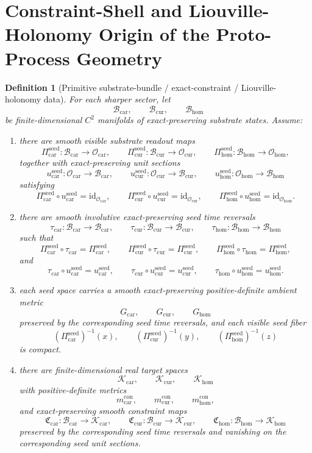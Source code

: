 \documentclass[11pt]{article}
\newcommand{\TensorObjClass}{\mathcal O_{\mathrm{car}}}
\newcommand{\CurObjClass}{\mathcal O_{\mathrm{cur}}}
\newcommand{\HomObjClass}{\mathcal O_{\mathrm{hom}}}
\newcommand{\TensorSeedSpace}{\mathcal B_{\mathrm{car}}}
\newcommand{\CurSeedSpace}{\mathcal B_{\mathrm{cur}}}
\newcommand{\HomSeedSpace}{\mathcal B_{\mathrm{hom}}}
\newcommand{\TensorSeedRead}{\Pi_{\mathrm{car}}^{\mathrm{seed}}}
\newcommand{\CurSeedRead}{\Pi_{\mathrm{cur}}^{\mathrm{seed}}}
\newcommand{\HomSeedRead}{\Pi_{\mathrm{hom}}^{\mathrm{seed}}}
\newcommand{\TensorSeedUnit}{u_{\mathrm{car}}^{\mathrm{seed}}}
\newcommand{\CurSeedUnit}{u_{\mathrm{cur}}^{\mathrm{seed}}}
\newcommand{\HomSeedUnit}{u_{\mathrm{hom}}^{\mathrm{seed}}}
\newcommand{\TensorSeedTimeRev}{\tau_{\mathrm{car}}}
\newcommand{\CurSeedTimeRev}{\tau_{\mathrm{cur}}}
\newcommand{\HomSeedTimeRev}{\tau_{\mathrm{hom}}}
\newcommand{\TensorSeedMetric}{G_{\mathrm{car}}}
\newcommand{\CurSeedMetric}{G_{\mathrm{cur}}}
\newcommand{\HomSeedMetric}{G_{\mathrm{hom}}}
\newcommand{\TensorConstraintTarget}{\mathcal K_{\mathrm{car}}}
\newcommand{\CurConstraintTarget}{\mathcal K_{\mathrm{cur}}}
\newcommand{\HomConstraintTarget}{\mathcal K_{\mathrm{hom}}}
\newcommand{\TensorConstraintMetric}{m_{\mathrm{car}}^{\mathrm{con}}}
\newcommand{\CurConstraintMetric}{m_{\mathrm{cur}}^{\mathrm{con}}}
\newcommand{\HomConstraintMetric}{m_{\mathrm{hom}}^{\mathrm{con}}}
\newcommand{\TensorConstraintMap}{\mathfrak C_{\mathrm{car}}}
\newcommand{\CurConstraintMap}{\mathfrak C_{\mathrm{cur}}}
\newcommand{\HomConstraintMap}{\mathfrak C_{\mathrm{hom}}}
\newtheorem{definition}{Definition}
\begin{document}
\section{Constraint-Shell and Liouville-Holonomy Origin of the Proto-Process Geometry}

\begin{definition}[Primitive substrate-bundle / exact-constraint / Liouville-holonomy data]
\label{def:seed_geometry}
For each sharper sector, let
\[
\TensorSeedSpace,\qquad
\CurSeedSpace,\qquad
\HomSeedSpace
\]
be finite-dimensional \(C^2\) manifolds of exact-preserving substrate states. Assume:
\begin{enumerate}
    \item there are smooth visible substrate readout maps
    \[
    \TensorSeedRead:\TensorSeedSpace\to\TensorObjClass,\qquad
    \CurSeedRead:\CurSeedSpace\to\CurObjClass,\qquad
    \HomSeedRead:\HomSeedSpace\to\HomObjClass,
    \]
    together with exact-preserving unit sections
    \[
    \TensorSeedUnit:\TensorObjClass\to\TensorSeedSpace,\qquad
    \CurSeedUnit:\CurObjClass\to\CurSeedSpace,\qquad
    \HomSeedUnit:\HomObjClass\to\HomSeedSpace
    \]
    satisfying
    \[
    \TensorSeedRead\circ\TensorSeedUnit=\mathrm{id}_{\TensorObjClass},\qquad
    \CurSeedRead\circ\CurSeedUnit=\mathrm{id}_{\CurObjClass},\qquad
    \HomSeedRead\circ\HomSeedUnit=\mathrm{id}_{\HomObjClass}.
    \]
    \item there are smooth involutive exact-preserving seed time reversals
    \[
    \TensorSeedTimeRev:\TensorSeedSpace\to\TensorSeedSpace,\qquad
    \CurSeedTimeRev:\CurSeedSpace\to\CurSeedSpace,\qquad
    \HomSeedTimeRev:\HomSeedSpace\to\HomSeedSpace
    \]
    such that
    \[
    \TensorSeedRead\circ\TensorSeedTimeRev=\TensorSeedRead,\qquad
    \CurSeedRead\circ\CurSeedTimeRev=\CurSeedRead,\qquad
    \HomSeedRead\circ\HomSeedTimeRev=\HomSeedRead,
    \]
    and
    \[
    \TensorSeedTimeRev\circ\TensorSeedUnit=\TensorSeedUnit,\qquad
    \CurSeedTimeRev\circ\CurSeedUnit=\CurSeedUnit,\qquad
    \HomSeedTimeRev\circ\HomSeedUnit=\HomSeedUnit.
    \]
    \item each seed space carries a smooth exact-preserving positive-definite ambient metric
    \[
    \TensorSeedMetric,\qquad
    \CurSeedMetric,\qquad
    \HomSeedMetric
    \]
    preserved by the corresponding seed time reversals, and each visible seed fiber
    \[
    (\TensorSeedRead)^{-1}(x),\qquad
    (\CurSeedRead)^{-1}(y),\qquad
    (\HomSeedRead)^{-1}(z)
    \]
    is compact.
    \item there are finite-dimensional real target spaces
    \[
    \TensorConstraintTarget,\qquad
    \CurConstraintTarget,\qquad
    \HomConstraintTarget
    \]
    with positive-definite metrics
    \[
    \TensorConstraintMetric,\qquad
    \CurConstraintMetric,\qquad
    \HomConstraintMetric,
    \]
    and exact-preserving smooth constraint maps
    \[
    \TensorConstraintMap:\TensorSeedSpace\to\TensorConstraintTarget,\qquad
    \CurConstraintMap:\CurSeedSpace\to\CurConstraintTarget,\qquad
    \HomConstraintMap:\HomSeedSpace\to\HomConstraintTarget
    \]
    preserved by the corresponding seed time reversals and vanishing on the corresponding seed unit sections.


\end{enumerate}
\end{definition}
\end{document}
